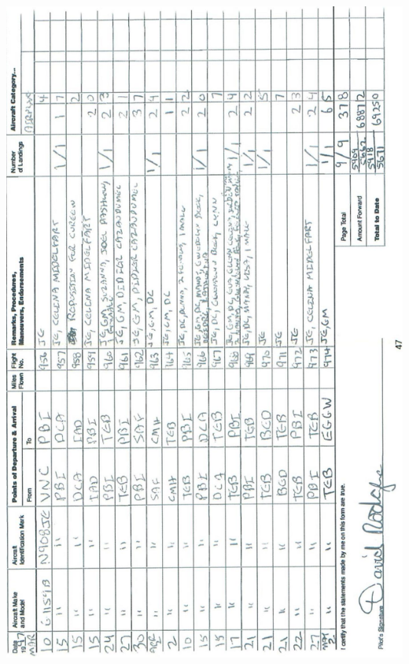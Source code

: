 \documentclass[10pt]{article}
\begin{document}
\includegraphics[max width=\textwidth, center]{2025_02_27_dd68c3d38de88f0516d9g-051}
\end{document}
